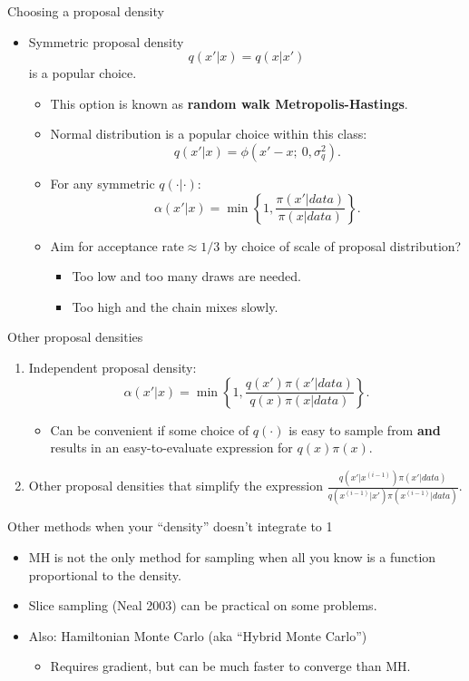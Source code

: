 \documentclass[aspectratio=169]{beamer}
\begin{document}
%
\begin{frame}{Choosing a proposal density}
\begin{itemize}
\item Symmetric proposal density 
\[
q(x'|x)=q(x|x')
\]
 is a popular choice. 
\begin{itemize}
\item This option is known as \textbf{random walk Metropolis-Hastings}.
\item Normal distribution is a popular choice within this class: 
\[
q(x'|x)=\phi(x'-x;\ 0,\sigma_{q}^{2}).
\]
\item For any symmetric $q(\cdot|\cdot)$:
\[
\alpha(x'|x)=\min\left\{ 1,\frac{\pi(x'|data)}{\pi(x|data)}\right\} .
\]
\item Aim for acceptance rate$\approx1/3$ by choice of scale of proposal
distribution? 
\begin{itemize}
\item Too low and too many draws are needed.
\item Too high and the chain mixes slowly.
\end{itemize}
\end{itemize}
\end{itemize}
\end{frame}
%
\begin{frame}{Other proposal densities}
\begin{enumerate}
\item Independent proposal density: 
\[
\alpha(x'|x)=\min\left\{ 1,\frac{q(x')\pi(x'|data)}{q(x)\pi(x|data)}\right\} .
\]

\begin{itemize}
\item Can be convenient if some choice of $q(\cdot)$ is easy to sample
from \textbf{and }results in an easy-to-evaluate expression for $q(x)\pi(x).$ 
\end{itemize}
\item Other proposal densities that simplify the expression $\frac{q(x'|x^{(i-1)})\pi(x'|data)}{q(x^{(i-1)}|x')\pi(x^{(i-1)}|data)}$.
\end{enumerate}
\end{frame}
%
\begin{frame}{Other methods when your ``density'' doesn't integrate to 1}
\begin{itemize}
\item MH is not the only method for sampling when all you know is a function
proportional to the density.
\item Slice sampling (Neal 2003) can be practical on some problems.
\item Also: Hamiltonian Monte Carlo (aka ``Hybrid Monte Carlo'')
\begin{itemize}
\item Requires gradient, but can be much faster to converge than MH.
\end{itemize}
\end{itemize}
\end{frame}
\end{document}
